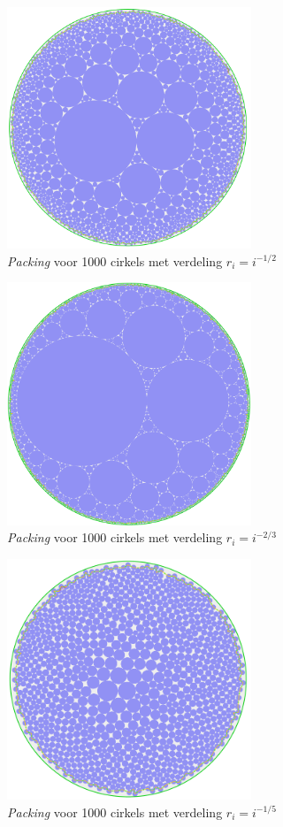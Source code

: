 \documentclass[12pt,a4paper,oneside]{book}
\begin{document}
{\begin{figure}
  \centering
  \includegraphics[width=0.65\textwidth]{packing-neg1div2-1000.png}
  \caption{\textit{Packing} voor 1000 cirkels met verdeling $r_i=i^{-1/2}$}
\end{figure}

\begin{figure}
  \centering
  \includegraphics[width=0.65\textwidth]{packing-neg2div3-1000.png}
  \caption{\textit{Packing} voor 1000 cirkels met verdeling $r_i=i^{-2/3}$}
\end{figure}

\begin{figure}
  \centering
  \includegraphics[width=0.65\textwidth]{packing-neg1div5-1000.png}
  \caption{\textit{Packing} voor 1000 cirkels met verdeling $r_i=i^{-1/5}$}
\end{figure}

}
\end{document}
